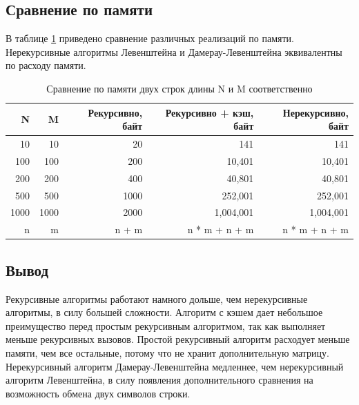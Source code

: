 \documentclass{article}
\begin{document}
\subsection{Сравнение по памяти}
В таблице \ref{tbl:mem_comp} приведено сравнение различных реализаций по памяти. Нерекурсивные алгоритмы
Левенштейна и Дамерау-Левенштейна эквивалентны по расходу памяти.
\clearpage\begin{table}[h]
	\begin{center}
	\caption{\label{tbl:mem_comp} Сравнение по памяти двух строк длины N и M соответственно}
	\begin{tabular}{|r|r|r|r|r|}
		\hline
		N & M & Рекурсивно, байт &  Рекурсивно + кэш, байт & Нерекурсивно, байт
		\\ \hline
		10 & 10 & 20 & 141 & 141
		\\ \hline
		100 & 100 & 200 & 10,401 & 10,401
		\\ \hline
		200 & 200 & 400 & 40,801 & 40,801
		\\ \hline
		500 & 500 & 1000 & 252,001 & 252,001
		\\ \hline
		1000 & 1000 & 2000 & 1,004,001 & 1,004,001
		\\ \hline
		n & m & n + m & n * m + n + m & n * m + n + m
		\\ \hline
	\end{tabular}
	\end{center}
\end{table}

\subsection{Вывод}
Рекурсивные алгоритмы работают намного дольше, чем нерекурсивные  алгоритмы, в силу большей сложности.
Алгоритм с кэшем дает небольшое преимущество перед простым рекурсивным алгоритмом, так как выполняет
меньше рекурсивных вызовов. Простой рекурсивный алгоритм расходует меньше  памяти, чем все остальные,
потому что не хранит дополнительную матрицу. Нерекурсивный алгоритм Дамерау-Левенштейна медленнее, чем 
нерекурсивный алгоритм Левенштейна, в силу появления дополнительного сравнения на возможность обмена
двух символов строки.
\end{document}
